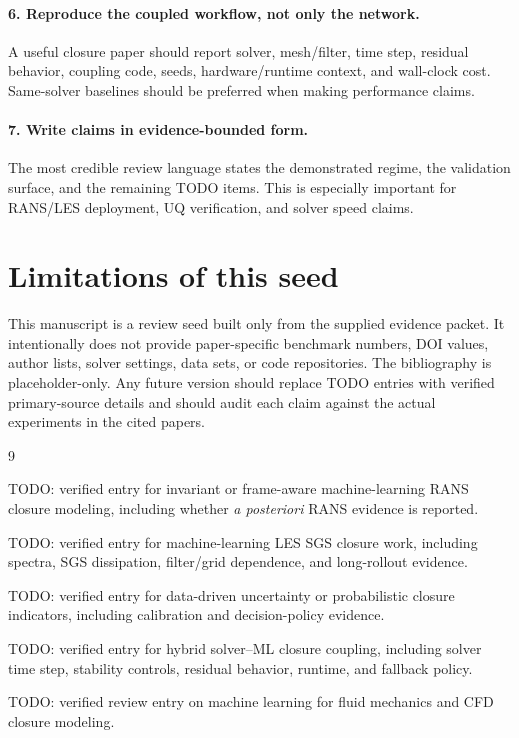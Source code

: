 \documentclass[11pt]{article}
\newcommand{\aposteriori}{\textit{a posteriori}}
\begin{document}
\paragraph{6. Reproduce the coupled workflow, not only the network.}
A useful closure paper should report solver, mesh/filter, time step, residual behavior, coupling code, seeds, hardware/runtime context, and wall-clock cost. Same-solver baselines should be preferred when making performance claims.

\paragraph{7. Write claims in evidence-bounded form.}
The most credible review language states the demonstrated regime, the validation surface, and the remaining TODO items. This is especially important for RANS/LES deployment, UQ verification, and solver speed claims.

\section{Limitations of this seed}

This manuscript is a review seed built only from the supplied evidence packet. It intentionally does not provide paper-specific benchmark numbers, DOI values, author lists, solver settings, data sets, or code repositories. The bibliography is placeholder-only. Any future version should replace TODO entries with verified primary-source details and should audit each claim against the actual experiments in the cited papers.

\begin{thebibliography}{9}

TODO: verified entry for invariant or frame-aware machine-learning RANS closure modeling, including whether \aposteriori{} RANS evidence is reported.

TODO: verified entry for machine-learning LES SGS closure work, including spectra, SGS dissipation, filter/grid dependence, and long-rollout evidence.

TODO: verified entry for data-driven uncertainty or probabilistic closure indicators, including calibration and decision-policy evidence.

TODO: verified entry for hybrid solver--ML closure coupling, including solver time step, stability controls, residual behavior, runtime, and fallback policy.

TODO: verified review entry on machine learning for fluid mechanics and CFD closure modeling.

\end{thebibliography}
\end{document}
